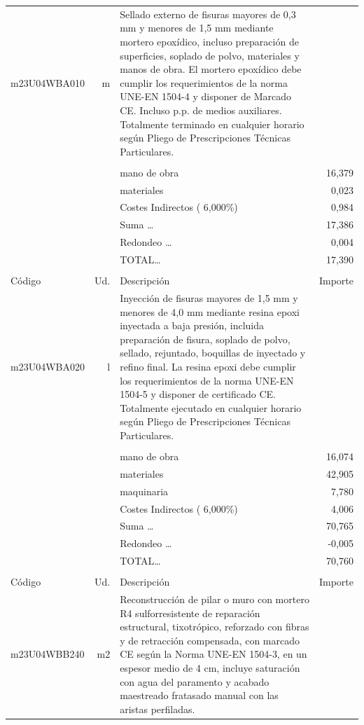 \begin{supertabular}{l r p{60mm} r}
\hline%
m23U04WBA010&m&Sellado externo de fisuras mayores de 0,3 mm y menores de 1,5 mm mediante mortero epoxídico, incluso preparación de superficies, soplado de polvo, materiales y manos de obra. El mortero epoxídico debe cumplir los requerimientos de la norma UNE{-}EN 1504{-}4 y disponer de Marcado CE. Incluso p.p. de medios auxiliares. Totalmente terminado en cualquier horario según Pliego de Prescripciones Técnicas Particulares.&\\%
&&&\\%
&&mano de obra&    16,379\\%
&&materiales&     0,023\\%
&&Costes Indirectos (     6,000\%)&     0,984\\%
&&Suma \ldots&    17,386\\%
&&Redondeo \ldots&     0,004\\%
%
&&TOTAL\ldots&    17,390\\%
&&&\\%
Código&Ud.&Descripción&Importe\\%
\hline%
m23U04WBA020&l&Inyección de fisuras mayores de 1,5 mm y menores de 4,0 mm mediante resina epoxi inyectada a baja presión, incluida preparación de fisura, soplado de polvo, sellado, rejuntado, boquillas de inyectado y refino final. La resina epoxi debe cumplir los requerimientos de la norma UNE{-}EN 1504{-}5 y disponer de certificado CE. Totalmente ejecutado en cualquier horario según Pliego de Prescripciones Técnicas Particulares.&\\%
&&&\\%
&&mano de obra&    16,074\\%
&&materiales&    42,905\\%
&&maquinaria&     7,780\\%
&&Costes Indirectos (     6,000\%)&     4,006\\%
&&Suma \ldots&    70,765\\%
&&Redondeo \ldots&    {-}0,005\\%
%
&&TOTAL\ldots&    70,760\\%
&&&\\%
Código&Ud.&Descripción&Importe\\%
\hline%
m23U04WBB240&m2&Reconstrucción de pilar o muro con mortero R4 sulforresistente de reparación estructural, tixotrópico, reforzado con fibras y de retracción compensada, con marcado CE según la Norma UNE{-}EN 1504{-}3, en un espesor medio de 4 cm, incluye saturación con agua del paramento y acabado maestreado fratasado manual con las aristas perfiladas.&\\%

\end{supertabular}
